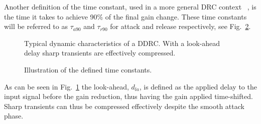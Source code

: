\documentclass[../main2.tex]{subfiles}
\providecommand{\rootdir}{..}
\begin{document}
Another definition of the time constant, used in a more general DRC context ~\cite{mcnally1984dynamic}, is the time it takes to achieve 90\% of the final gain change. These time constants will be referred to as $\tau_{a90}$ and $\tau_{r90}$ for attack and release respectively, see Fig.~\ref{fig:time_constants}.
\begin{figure}
\centerline{}
\caption{Typical dynamic characteristics of a DDRC. With a look-ahead delay sharp transients are effectively compressed.}
\label{fig:typical_envelope_detailed}
\end{figure}
\begin{figure}
\centerline{}
\caption{Illustration of the defined time constants.}
\label{fig:time_constants}
\end{figure}
As can be seen in Fig.~\ref{fig:typical_envelope_detailed} the look-ahead, $d_{la}$, is defined as the applied delay to the input signal before the gain reduction, thus having the gain applied time-shifted. Sharp transients can thus be compressed effectively despite the smooth attack phase.
\end{document}
